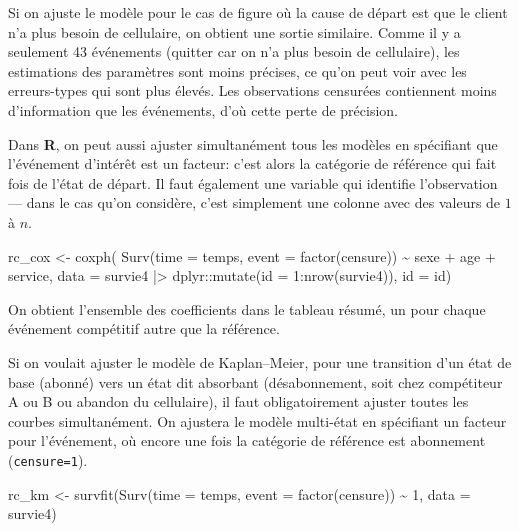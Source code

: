\documentclass[
  11pt,
  letterpaper,
]{book}
\newenvironment{Shaded}{\begin{snugshade}}{\end{snugshade}}
\newcommand{\AttributeTok}[1]{\textcolor[rgb]{0.40,0.45,0.13}{#1}}
\newcommand{\DecValTok}[1]{\textcolor[rgb]{0.68,0.00,0.00}{#1}}
\newcommand{\FunctionTok}[1]{\textcolor[rgb]{0.28,0.35,0.67}{#1}}
\newcommand{\NormalTok}[1]{\textcolor[rgb]{0.00,0.23,0.31}{#1}}
\newcommand{\OtherTok}[1]{\textcolor[rgb]{0.00,0.23,0.31}{#1}}
\newcommand{\SpecialCharTok}[1]{\textcolor[rgb]{0.37,0.37,0.37}{#1}}
\theoremstyle{definition}
\theoremstyle{remark}
\begin{document}
Si on ajuste le modèle pour le cas de figure où la cause de départ est
que le client n'a plus besoin de cellulaire, on obtient une sortie
similaire. Comme il y a seulement 43 événements (quitter car on n'a plus
besoin de cellulaire), les estimations des paramètres sont moins
précises, ce qu'on peut voir avec les erreurs-types qui sont plus
élevés. Les observations censurées contiennent moins d'information que
les événements, d'où cette perte de précision.

Dans \textbf{R}, on peut aussi ajuster simultanément tous les modèles en
spécifiant que l'événement d'intérêt est un facteur: c'est alors la
catégorie de référence qui fait fois de l'état de départ. Il faut
également une variable qui identifie l'observation --- dans le cas qu'on
considère, c'est simplement une colonne avec des valeurs de \(1\) à
\(n\).

\begin{Shaded}
\begin{Highlighting}[]
\NormalTok{rc\_cox }\OtherTok{\textless{}{-}} \FunctionTok{coxph}\NormalTok{(}
  \FunctionTok{Surv}\NormalTok{(}\AttributeTok{time =}\NormalTok{ temps, }
       \AttributeTok{event =} \FunctionTok{factor}\NormalTok{(censure)) }\SpecialCharTok{\textasciitilde{}}\NormalTok{ sexe }\SpecialCharTok{+}\NormalTok{ age }\SpecialCharTok{+}\NormalTok{ service,}
  \AttributeTok{data =}\NormalTok{ survie4 }\SpecialCharTok{|\textgreater{}}
\NormalTok{    dplyr}\SpecialCharTok{::}\FunctionTok{mutate}\NormalTok{(}\AttributeTok{id =} \DecValTok{1}\SpecialCharTok{:}\FunctionTok{nrow}\NormalTok{(survie4)),}
  \AttributeTok{id =}\NormalTok{ id)}
\end{Highlighting}
\end{Shaded}

On obtient l'ensemble des coefficients dans le tableau résumé, un pour
chaque événement compétitif autre que la référence.

Si on voulait ajuster le modèle de Kaplan--Meier, pour une transition
d'un état de base (abonné) vers un état dit absorbant (désabonnement,
soit chez compétiteur A ou B ou abandon du cellulaire), il faut
obligatoirement ajuster toutes les courbes simultanément. On ajustera le
modèle multi-état en spécifiant un facteur pour l'événement, où encore
une fois la catégorie de référence est abonnement (\texttt{censure=1}).

\begin{Shaded}
\begin{Highlighting}[]
\NormalTok{rc\_km }\OtherTok{\textless{}{-}} \FunctionTok{survfit}\NormalTok{(}\FunctionTok{Surv}\NormalTok{(}\AttributeTok{time =}\NormalTok{ temps, }
             \AttributeTok{event =} \FunctionTok{factor}\NormalTok{(censure)) }\SpecialCharTok{\textasciitilde{}} \DecValTok{1}\NormalTok{,}
             \AttributeTok{data =}\NormalTok{ survie4)}
\end{Highlighting}
\end{Shaded}
\end{document}
